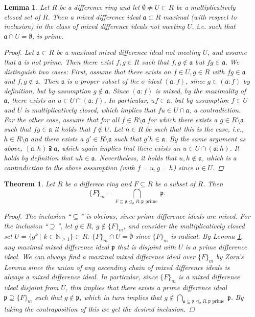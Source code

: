 \documentclass{article}
\def\NE{\mathbb{N}_{\geq1}}
\def\a{\mathfrak{a}}
\def\p{\mathfrak{p}}
\def\s{\sigma}
\def\si{\unlhd_{\sigma}}
\newenvironment{bew}{\begin{proof}[Proof]}{\end{proof}}
\theoremstyle{plain}
\newtheorem{theorem}[Satz]{Theorem}
\newtheorem{lem}[Satz]{Lemma}
\theoremstyle{definition}
\begin{document}
\begin{lem}\label{maxmixed=prime}
Let $R$ be a difference ring and let $\emptyset \neq U \subset R$ be a multiplicatively closed set of $R$. Then a mixed difference ideal $\a \subset R$ maximal (with respect to inclusion) in the class of mixed difference
ideals not meeting $U$, i.e. such that $\a \cap U = \emptyset$, is prime. 
\begin{bew}
Let $\a \subset R$ be a maximal mixed difference ideal not meeting $U$, and assume that $\a$ is not prime. Then there exist $f, g \in R$ such that $f,g \notin \a$ but $fg \in \a$.
We distinguish two cases: First, assume that there exists an $f \in U, g \in R$ with $fg \in \a$ and $f, g \notin \a$. Then $\a$ is a proper subset of the $\s$-ideal $(\a:f)$, since $g \in (\a:f)$ by definition, but by assumption $g \notin \a$.
Since $(\a:f)$ is mixed, by the maximality of $\a$, there exists an $u \in U \cap (\a:f)$. In particular, $uf \in \a$, but by assumption $f \in U$ and $U$ is multiplicatively closed, which implies that $fu \in U \cap \a$, a contradiction. \\
For the other case, assume that for all $f \in R \setminus \a$ for which there exists a $g \in R \setminus \a$ such that $fg \in \a$ it holds that $f \notin U$. Let $h \in R$ be such that this is the case, i.e., $h \in R \setminus \a$ and there exists a $g' \in R \setminus \a$ such that $g'h \in \a$.
By the same argument as above, $(\a:h) \supsetneqq \a$, which again implies that there exists an $u \in U \cap (\a:h)$. It holds by definition that $uh \in \a$. Nevertheless,  it holds that $u,h \notin \a$, which is a contradiction to the above assumption (with $f = u, g = h$) since $u \in U$. 
\end{bew}
\end{lem}

\begin{theorem}
Let $R$ be a differece ring and $F \subseteq R$ be a subset of $R$. Then
\[ \{ F \}_m = \bigcap_{F \subseteq \p \si R, \p \text{ prime }} \p.\]
\begin{proof}
The inclusion ``$\subseteq$'' is obvious, since prime difference ideals are mixed. For the inclusion ``$\supseteq$'', let $g \in R, ~ g \notin \{ F \}_m$, and consider the multiplicatively closed set $U = \{ g^k \mid k \in \NE \} \subset R$. 
$\{ F \}_m \cap U = \emptyset$ since $\{ F \}_m$ is radical. By Lemma \ref{maxmixed=prime}, any maximal mixed difference ideal $\p$ that is disjoint with $U$ is a prime difference ideal. We can always find a maximal mixed difference ideal over $\{F\}_m$ by Zorn's Lemma since
the union of any ascending chain of mixed difference ideals is always a mixed difference ideal. In particular, since $\{F\}_m$ is a mixed difference ideal disjoint from $U$, this implies that there exists a prime difference ideal $\p \supseteq \{F\}_m$ such that $g \notin \p$,
which in turn implies that $g \notin \bigcap_{\a \subseteq \p \si R, \p \text{ prime }} \p$. By taking the contraposition of this we get the desired inclusion.
\end{proof}
\end{theorem}
\end{document}
